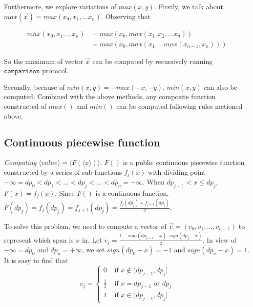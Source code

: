 \documentclass[letterpaper]{article} %
\begin{document}
       Furthermore, we explore variations of $max(x,y)$.
       Firstly, we talk about $max(\overrightarrow{x})=max(x_{0},x_{1},...x_{n})$. Observing that
       
       \begin{align*}
           max(x_{0},x_{1},...x_{n}) &= max(x_{0},max(x_{1},x_{2},...x_{n})) \\
         &= max(x_{0},max(x_{1},...max(x_{n-1},x_{n})))
       \end{align*}
       
       So the maximum of vector $\overrightarrow{x}$ can be computed by recursively running $\mathtt{comparison}$ protocol.
       
       Secondly, because of $min(x,y)=-max(-x,-y)$,  $min(x,y)$ can also be computed.
       Combined with the above methods, 
       any composite function constructed of $max()$ and $min()$ can be computed following rules metioned above.
       
       
       
       
       
       
       \subsection{Continuous piecewise function}
       \emph{Computing} $\langle value\rangle  = \langle F(\langle x\rangle)\rangle $. 
       $F()$ is a public continuous piecewise function constructed by a series of sub-functions $f_{j}(x)$ 
       with dividing point $-\infty =dp_{0}<dp_{1}<...<dp_{j}<...<dp_{n}=+\infty$. 
       When $dp_{j-1}< x\leq dp_{j}$, $F(x) =f_{j}(x)$.
       Since $F()$ is a continuous function, $F(dp_{j}) =f_{j}(dp_{j})=f_{j+1}(dp_{j})=\frac{f_{j}(dp_{j})+f_{j+1}(dp_{j})}{2}$.
       
    
       To solve this problem, we need to compute a vector of 
       $\overrightarrow{v}=(v_{0},v_{1},...,v_{n-1})$ to represent which span is $x$ in. 
       Let $v_{j} = \frac{1-sign(dp_{j-1}-x)\cdot sign(dp_{j}-x)}{2}$.
       In view of $-\infty =dp_{0}$ and $dp_{n}=+\infty$,
       we set $sign(dp_{0}-x)=-1$ and $sign(dp_{n}-x)=1$.
       It is easy to find that
       $$v_{j}=\begin{cases}
           0 & \text{ if } x\notin (dp_{j-1},dp_{j}] \\  
           \frac{1}{2} & \text{ if } x = dp_{j-1} \text{ or } dp_{j}\\ 
           1 & \text{ if } x\in (dp_{j-1},dp_{j}] 
          \end{cases}$$
       
\end{document}

